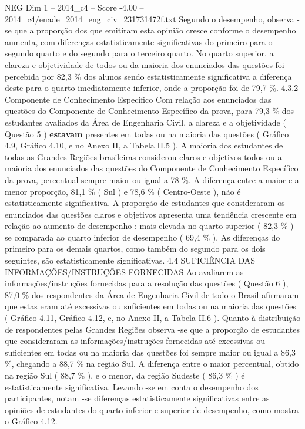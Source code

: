 \begin{textsample}{NEG Dim 1 – 2014\_c4 – Score -4.00 – 2014\_c4/enade\_2014\_eng\_civ\_231731472f.txt}
Segundo o desempenho, observa -se que a proporção dos que emitiram esta opinião cresce conforme o desempenho aumenta, com diferenças estatisticamente significativas do primeiro para o segundo quarto e do segundo para o terceiro quarto.
No quarto superior, a clareza e objetividade de todos ou da maioria dos enunciados das questões foi percebida por 82,3 \% dos alunos sendo estatisticamente significativa a diferença deste para o quarto imediatamente inferior, onde a proporção foi de 79,7 \%. 4.3.2 Componente de Conhecimento Específico Com relação aos enunciados das questões do Componente de Conhecimento Específico da prova, para 79,3 \% dos estudantes avaliados da Área de Engenharia Civil, a clareza e a objetividade ( Questão 5 ) \textbf{estavam} presentes em todas ou na maioria das questões ( Gráfico 4.9, Gráfico 4.10, e no Anexo II, a Tabela II.5 ).
A maioria dos estudantes de todas as Grandes Regiões brasileiras considerou claros e objetivos todos ou a maioria dos enunciados das questões do Componente de Conhecimento Específico da prova, percentual sempre maior ou igual a 78 \%.
A diferença entre a maior e a menor proporção, 81,1 \% ( Sul ) e 78,6 \% ( Centro-Oeste ), não é estatisticamente significativa.
A proporção de estudantes que consideraram os enunciados das questões claros e objetivos apresenta uma tendência crescente em relação ao aumento de desempenho : mais elevada no quarto superior ( 82,3 \% ) se comparada ao quarto inferior de desempenho ( 69,4 \% ).
As diferenças do primeiro para os demais quartos, como também do segundo para os dois seguintes, são estatisticamente significativas. 4.4 SUFICIÊNCIA DAS INFORMAÇÕES/INSTRUÇÕES FORNECIDAS Ao avaliarem as informações/instruções fornecidas para a resolução das questões ( Questão 6 ), 87,0 \% dos respondentes da Área de Engenharia Civil de todo o Brasil afirmaram que estas eram até excessivas ou suficientes em todas ou na maioria das questões ( Gráfico 4.11, Gráfico 4.12, e, no Anexo II, a Tabela II.6 ).
Quanto à distribuição de respondentes pelas Grandes Regiões observa -se que a proporção de estudantes que consideraram as informações/instruções fornecidas até excessivas ou suficientes em todas ou na maioria das questões foi sempre maior ou igual a 86,3 \%, chegando a 88,7 \% na região Sul.
A diferença entre o maior percentual, obtido na região Sul ( 88,7 \% ), e o menor, da região Sudeste ( 86,3 \% ) é estatisticamente significativa.
Levando -se em conta o desempenho dos participantes, notam -se diferenças estatisticamente significativas entre as opiniões de estudantes do quarto inferior e superior de desempenho, como mostra o Gráfico 4.12.

\end{textsample}
